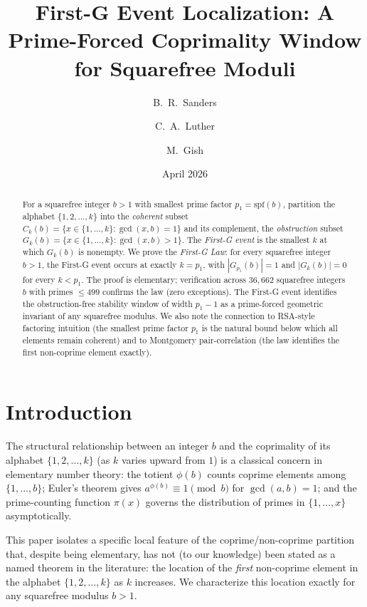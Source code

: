\documentclass[11pt,reqno]{amsart}
\title{First-G Event Localization: A Prime-Forced Coprimality
Window for Squarefree Moduli}
\author{B.~R.~Sanders}
\author{C.~A.~Luther}
\author{M.~Gish}
\date{April 2026}
\theoremstyle{plain}
\theoremstyle{definition}
\begin{document}
\maketitle

\begin{abstract}
For a squarefree integer $b > 1$ with smallest prime factor
$p_1 = \mathrm{spf}(b)$, partition the alphabet $\{1, 2, \ldots, k\}$
into the \emph{coherent} subset $C_k(b) = \{x \in \{1, \ldots, k\}
: \gcd(x, b) = 1\}$ and its complement, the \emph{obstruction}
subset $G_k(b) = \{x \in \{1, \ldots, k\} : \gcd(x, b) > 1\}$. The
\emph{First-G event} is the smallest $k$ at which $G_k(b)$ is nonempty.
We prove the \emph{First-G Law}: for every squarefree integer
$b > 1$, the First-G event occurs at exactly $k = p_1$, with
$|G_{p_1}(b)| = 1$ and $|G_k(b)| = 0$ for every $k < p_1$. The
proof is elementary; verification across $36{,}662$ squarefree
integers $b$ with primes $\leq 499$ confirms the law (zero exceptions).
The First-G event identifies the obstruction-free stability window
of width $p_1 - 1$ as a prime-forced geometric invariant of any
squarefree modulus. We also note the connection to RSA-style
factoring intuition (the smallest prime factor $p_1$ is the natural
bound below which all elements remain coherent) and to Montgomery
pair-correlation (the law identifies the first non-coprime element
exactly).
\end{abstract}

\section{Introduction}

The structural relationship between an integer $b$ and the
coprimality of its alphabet $\{1, 2, \ldots, k\}$ (as $k$ varies
upward from $1$) is a classical concern in elementary number theory:
the totient $\phi(b)$ counts coprime elements among
$\{1, \ldots, b\}$; Euler's theorem gives $a^{\phi(b)} \equiv 1
\pmod b$ for $\gcd(a, b) = 1$; and the prime-counting function
$\pi(x)$ governs the distribution of primes in
$\{1, \ldots, x\}$ asymptotically.

This paper isolates a specific local feature of the
coprime/non-coprime partition that, despite being elementary, has
not (to our knowledge) been stated as a named theorem in the
literature: the location of the \emph{first} non-coprime element
in the alphabet $\{1, 2, \ldots, k\}$ as $k$ increases. We
characterize this location exactly for any squarefree modulus
$b > 1$.
\end{document}
